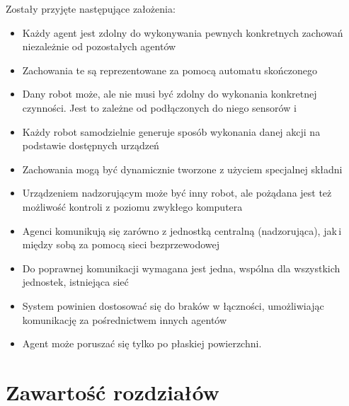 Zostały przyjęte następujące założenia:
\begin{itemize}
  \item Każdy agent jest zdolny do wykonywania pewnych konkretnych zachowań niezależnie od pozostałych agentów
  \item Zachowania te są reprezentowane za pomocą automatu skończonego
  \item Dany robot może, ale nie musi być zdolny do wykonania konkretnej czynności. Jest to zależne od podłączonych do niego sensorów i 
  \item Każdy robot samodzielnie generuje sposób wykonania danej akcji na podstawie dostępnych urządzeń
  \item Zachowania mogą być dynamicznie tworzone z użyciem specjalnej składni
  \item Urządzeniem nadzorującym może być inny robot, ale pożądana jest też możliwość kontroli z poziomu zwykłego komputera
  \item Agenci komunikują się zarówno z jednostką centralną (nadzorująca), jak\,i między sobą za pomocą sieci bezprzewodowej
  \item Do poprawnej komunikacji wymagana jest jedna, wspólna dla wszystkich jednostek, istniejąca sieć
  \item System powinien dostosować się do braków w łączności, umożliwiając komunikację za pośrednictwem innych agentów
  \item Agent może poruszać się tylko po płaskiej powierzchni.
\end{itemize}

\section{Zawartość rozdziałów}

